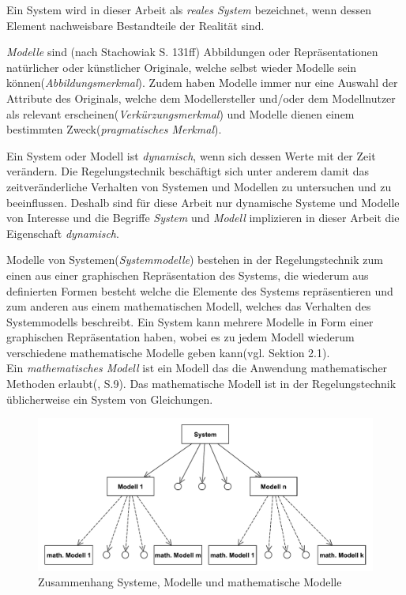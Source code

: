 Ein System wird in dieser Arbeit als \textit{reales System} bezeichnet, wenn dessen Element nachweisbare Bestandteile der Realität sind.

\textit{Modelle} sind (nach Stachowiak\cite{STA73} S. 131ff) Abbildungen oder Repräsentationen natürlicher oder künstlicher Originale, welche selbst wieder Modelle sein können(\textit{Abbildungsmerkmal}). Zudem haben Modelle immer nur eine Auswahl der Attribute des Originals, welche dem Modellersteller und/oder dem Modellnutzer als relevant erscheinen(\textit{Verkürzungsmerkmal}) und Modelle dienen einem bestimmten Zweck(\textit{pragmatisches Merkmal}). 

Ein System oder Modell ist \textit{dynamisch}, wenn sich dessen Werte mit der Zeit verändern. Die Regelungstechnik beschäftigt sich unter anderem damit das zeitveränderliche Verhalten von Systemen und Modellen zu untersuchen und zu beeinflussen. Deshalb sind für diese Arbeit nur dynamische Systeme und Modelle von Interesse und die Begriffe \textit{System} und \textit{Modell} implizieren in dieser Arbeit die Eigenschaft \textit{dynamisch}. 

Modelle von Systemen(\textit{Systemmodelle}) bestehen in der Regelungstechnik zum einen aus einer graphischen Repräsentation des Systems, die wiederum aus definierten Formen besteht welche die Elemente des Systems repräsentieren und zum anderen aus einem mathematischen Modell, welches das Verhalten des Systemmodells beschreibt. Ein System kann mehrere Modelle in Form einer graphischen Repräsentation haben, wobei es zu jedem Modell wiederum verschiedene mathematische Modelle geben kann(vgl. \cite{LUD95} Sektion 2.1).\\
Ein \textit{mathematisches Modell} ist ein Modell das die Anwendung mathematischer Methoden erlaubt(\cite{GRVO16}, S.9). Das mathematische Modell ist in der Regelungstechnik üblicherweise ein System von Gleichungen. 

\begin{figure}[H]
	\centering
	\includegraphics[width=0.9\linewidth]{Systeme_Modelle_Math_Beschreibung}
	\caption{Zusammenhang Systeme, Modelle und mathematische Modelle}
	\label{fig:SysModelleSkizze}
\end{figure}

